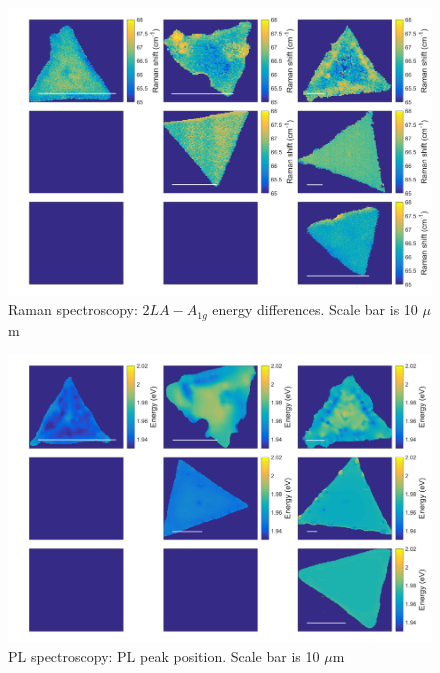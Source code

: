 \documentclass[12pt]{article}
\begin{document}
\begin{figure}[h]
\begin{center}
\includegraphics[scale=0.3]{PaperSIMapsDifference.png}
\caption{Raman spectroscopy: $2LA-A_{1g}$ energy differences. Scale bar is 10 $\mu$m}
\label{fig:PaperSIMapsDifference}
\end{center}
\end{figure}

\begin{figure}[h]
\begin{center}
\includegraphics[scale=0.3]{PaperSIMapsPositionPL.png}
\caption{PL spectroscopy: PL peak position. Scale bar is 10 $\mu$m}
\label{fig:PaperSIMapsPositionPL}
\end{center}
\end{figure}
\end{document}
